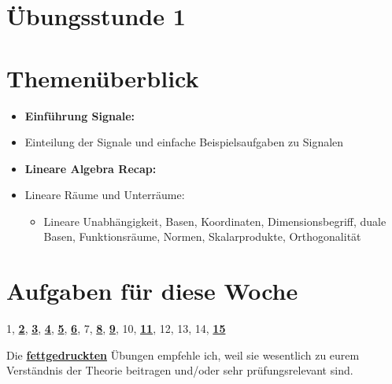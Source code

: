 \documentclass[11pt]{article}
\begin{document}
\thispagestyle{firstpage}

\setlength{\headheight}{1 \baselineskip}  %
\setlength{\parindent}{0pt}  %
\setlength{\parskip}{\baselineskip}  %

\vspace*{-5px}
\section*{Übungsstunde 1}

\section*{Themenüberblick}
\begin{itemize}
    \item \textbf{Einführung Signale:}
    \item[] Einteilung der Signale und einfache Beispielsaufgaben zu Signalen
    \item \textbf{Lineare Algebra Recap:}
    \item[] Lineare Räume und Unterräume: \begin{itemize}
        \item[] Lineare Unabhängigkeit, Basen, Koordinaten, Dimensionsbegriff, duale Basen, Funktionsräume, Normen, Skalarprodukte, Orthogonalität
    \end{itemize}
\end{itemize}

\section*{Aufgaben für diese Woche}
\vspace{-0.5cm}

1, \underline{\textbf{2}}, \underline{\textbf{3}}, \underline{\textbf{4}}, \underline{\textbf{5}}, \underline{\textbf{6}}, 7, \underline{\textbf{8}}, \underline{\textbf{9}}, 10, \underline{\textbf{11}}, 12, 13, 14, \underline{\textbf{15}}\\
\vspace{-0.5cm}

Die \underline{\textbf{fettgedruckten}} Übungen empfehle ich, weil sie wesentlich zu eurem Verständnis der Theorie beitragen und/oder sehr prüfungsrelevant sind.
\end{document}
